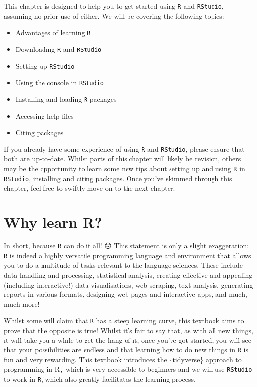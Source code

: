 \documentclass[
  letterpaper,
  DIV=11,
  numbers=noendperiod,
  oneside]{scrreprt}
\providecommand{\tightlist}{%
  \setlength{\itemsep}{0pt}\setlength{\parskip}{0pt}}\usepackage{longtable,booktabs,array}
\begin{document}
This chapter is designed to help you to get started using \texttt{R} and
\texttt{RStudio}, assuming no prior use of either. We will be covering
the following topics:

\begin{itemize}
\tightlist
\item
  Advantages of learning \texttt{R}
\item
  Downloading \texttt{R} and \texttt{RStudio}
\item
  Setting up \texttt{RStudio}
\item
  Using the console in \texttt{RStudio}
\item
  Installing and loading \texttt{R} packages
\item
  Accessing help files
\item
  Citing packages
\end{itemize}

If you already have some experience of using \texttt{R} and
\texttt{RStudio}, please ensure that both are up-to-date. Whilst parts
of this chapter will likely be revision, others may be the opportunity
to learn some new tips about setting up and using \texttt{R} in
\texttt{RStudio}, installing and citing packages. Once you've skimmed
through this chapter, feel free to swiftly move on to the next chapter.

\section{Why learn R?}\label{why-learn-r}

In short, because \texttt{R} can do it all! 🙃 This statement is only a
slight exaggeration: \texttt{R} is indeed a highly versatile programming
language and environment that allows you to do a multitude of tasks
relevant to the language sciences. These include data handling and
processing, statistical analysis, creating effective and appealing
(including interactive!) data visualisations, web scraping, text
analysis, generating reports in various formats, designing web pages and
interactive apps, and much, much more! 💪

Whilst some will claim that \texttt{R} has a steep learning curve, this
textbook aims to prove that the opposite is true! Whilst it's fair to
say that, as with all new things, it will take you a while to get the
hang of it, once you've got started, you will see that your
possibilities are endless and that learning how to do new things in
\texttt{R} is fun and very rewarding. This textbook introduces the
\{tidyverse\} approach to programming in R\texttt{,} which is very
accessible to beginners and we will use \texttt{RStudio} to work in
\texttt{R}, which also greatly facilitates the learning process.
\end{document}
